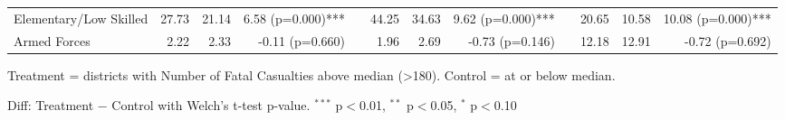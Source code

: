 \begin{table}[htbp]
\begin{tabular}{l rrr c rrr c rrr}
\quad Elementary/Low Skilled & 27.73 & 21.14 & 6.58 (p=0.000)*** &  & 44.25 & 34.63 & 9.62 (p=0.000)*** &  & 20.65 & 10.58 & 10.08 (p=0.000)*** \\
\quad Armed Forces & 2.22 & 2.33 & -0.11 (p=0.660) &  & 1.96 & 2.69 & -0.73 (p=0.146) &  & 12.18 & 12.91 & -0.72 (p=0.692) \\
\bottomrule
\end{tabular}
\begin{tablenotes}
\small
\item Treatment = districts with Number of Fatal Casualties above median (>180). Control = at or below median.
\item Diff: Treatment $-$ Control with Welch's t-test p-value. $^{{***}}$ p$<$0.01, $^{{**}}$ p$<$0.05, $^{{*}}$ p$<$0.10
\end{tablenotes}
\end{table}

\clearpage

